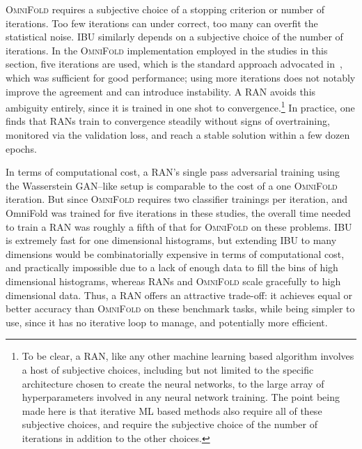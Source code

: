 {{            
            \textsc{OmniFold} requires a subjective choice of a stopping criterion or number of iterations.
            Too few iterations can under correct, too many can overfit the statistical noise.
            IBU similarly depends on a subjective choice of the number of iterations.
            In the \textsc{OmniFold} implementation employed in the studies in this section, five iterations are used, which is the standard approach advocated in~\cite{andreassen_omnifold_2020}, which was sufficient for good performance; using more iterations does not notably improve the agreement and can introduce instability.
            A RAN avoids this ambiguity entirely, since it is trained in one shot to convergence.\footnote{To be clear, a RAN, like any other machine learning based algorithm involves a host of subjective choices, including but not limited to the specific architecture chosen to create the neural networks, to the large array of hyperparameters involved in any neural network training. The point being made here is that iterative ML based methods also require all of these subjective choices, and require the subjective choice of the number of iterations in addition to the other choices.}
            In practice, one finds that RANs train to convergence steadily without signs of overtraining, monitored via the validation loss, and reach a stable solution within a few dozen epochs.
            
            In terms of computational cost, a RAN’s single pass adversarial training using the Wasserstein GAN--like setup is comparable to the cost of a one \textsc{OmniFold} iteration.
            But since \textsc{OmniFold} requires two classifier trainings per iteration, and OmniFold was trained for five iterations in these studies, the overall time needed to train a RAN was roughly a fifth of that for \textsc{OmniFold} on these problems.
            IBU is extremely fast for one dimensional histograms, but extending IBU to many dimensions would be combinatorially expensive in terms of computational cost, and practically impossible due to a lack of enough data to fill the bins of high dimensional histograms, whereas RANs and \textsc{OmniFold} scale gracefully to high dimensional data.
            Thus, a RAN offers an attractive trade-off: it achieves equal or better accuracy than \textsc{OmniFold} on these benchmark tasks, while being simpler to use, since it has no iterative loop to manage, and potentially more efficient.

}}
